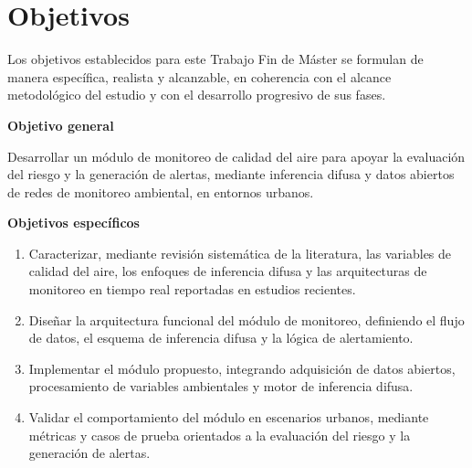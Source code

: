 
\section{Objetivos}

Los objetivos establecidos para este Trabajo Fin de Máster se formulan de manera específica, realista y alcanzable, en coherencia con el alcance metodológico del estudio y con el desarrollo progresivo de sus fases.

\textbf{Objetivo general}

Desarrollar un módulo de monitoreo de calidad del aire para apoyar la evaluación del riesgo y la generación de alertas, mediante inferencia difusa y datos abiertos de redes de monitoreo ambiental, en entornos urbanos.

\textbf{Objetivos específicos}

\begin{enumerate}
  \item Caracterizar, mediante revisión sistemática de la literatura, las variables de calidad del aire, los enfoques de inferencia difusa y las arquitecturas de monitoreo en tiempo real reportadas en estudios recientes.
  \item Diseñar la arquitectura funcional del módulo de monitoreo, definiendo el flujo de datos, el esquema de inferencia difusa y la lógica de alertamiento.
  \item Implementar el módulo propuesto, integrando adquisición de datos abiertos, procesamiento de variables ambientales y motor de inferencia difusa.
  \item Validar el comportamiento del módulo en escenarios urbanos, mediante métricas y casos de prueba orientados a la evaluación del riesgo y la generación de alertas.
\end{enumerate}
